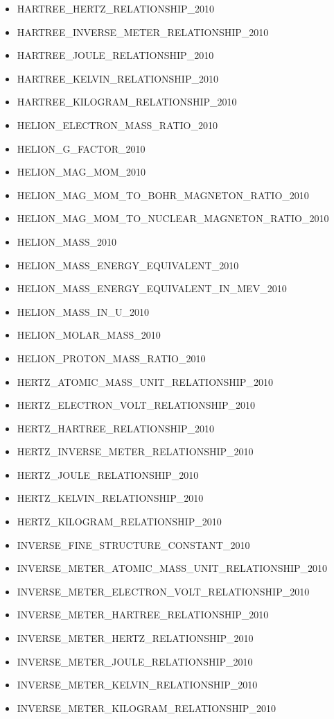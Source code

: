 \begin{itemize}
\item HARTREE\_HERTZ\_RELATIONSHIP\_2010
\item HARTREE\_INVERSE\_METER\_RELATIONSHIP\_2010
\item HARTREE\_JOULE\_RELATIONSHIP\_2010
\item HARTREE\_KELVIN\_RELATIONSHIP\_2010
\item HARTREE\_KILOGRAM\_RELATIONSHIP\_2010
\item HELION\_ELECTRON\_MASS\_RATIO\_2010
\item HELION\_G\_FACTOR\_2010
\item HELION\_MAG\_MOM\_2010
\item HELION\_MAG\_MOM\_TO\_BOHR\_MAGNETON\_RATIO\_2010
\item HELION\_MAG\_MOM\_TO\_NUCLEAR\_MAGNETON\_RATIO\_2010
\item HELION\_MASS\_2010
\item HELION\_MASS\_ENERGY\_EQUIVALENT\_2010
\item HELION\_MASS\_ENERGY\_EQUIVALENT\_IN\_MEV\_2010
\item HELION\_MASS\_IN\_U\_2010
\item HELION\_MOLAR\_MASS\_2010
\item HELION\_PROTON\_MASS\_RATIO\_2010
\item HERTZ\_ATOMIC\_MASS\_UNIT\_RELATIONSHIP\_2010
\item HERTZ\_ELECTRON\_VOLT\_RELATIONSHIP\_2010
\item HERTZ\_HARTREE\_RELATIONSHIP\_2010
\item HERTZ\_INVERSE\_METER\_RELATIONSHIP\_2010
\item HERTZ\_JOULE\_RELATIONSHIP\_2010
\item HERTZ\_KELVIN\_RELATIONSHIP\_2010
\item HERTZ\_KILOGRAM\_RELATIONSHIP\_2010
\item INVERSE\_FINE\_STRUCTURE\_CONSTANT\_2010
\item INVERSE\_METER\_ATOMIC\_MASS\_UNIT\_RELATIONSHIP\_2010
\item INVERSE\_METER\_ELECTRON\_VOLT\_RELATIONSHIP\_2010
\item INVERSE\_METER\_HARTREE\_RELATIONSHIP\_2010
\item INVERSE\_METER\_HERTZ\_RELATIONSHIP\_2010
\item INVERSE\_METER\_JOULE\_RELATIONSHIP\_2010
\item INVERSE\_METER\_KELVIN\_RELATIONSHIP\_2010
\item INVERSE\_METER\_KILOGRAM\_RELATIONSHIP\_2010

\end{itemize}

